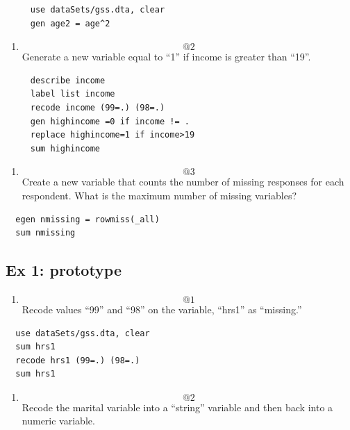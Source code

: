 \documentclass[]{book}
\providecommand{\tightlist}{%
  \setlength{\itemsep}{0pt}\setlength{\parskip}{0pt}}
\begin{document}
\begin{verbatim}
     use dataSets/gss.dta, clear
     gen age2 = age^2
\end{verbatim}

\begin{enumerate}
\def\labelenumi{\arabic{enumi}.}
\setcounter{enumi}{1}
\tightlist
\item
  \[@2\] Generate a new variable equal to ``1'' if income is greater
  than ``19''.
\end{enumerate}

\begin{verbatim}
     describe income
     label list income
     recode income (99=.) (98=.)
     gen highincome =0 if income != .
     replace highincome=1 if income>19
     sum highincome
\end{verbatim}

\begin{enumerate}
\def\labelenumi{\arabic{enumi}.}
\setcounter{enumi}{2}
\tightlist
\item
  \[@3\]Create a new variable that counts the number of missing
  responses for each respondent. What is the maximum number of missing
  variables?
\end{enumerate}

\begin{verbatim}
  egen nmissing = rowmiss(_all)
  sum nmissing
\end{verbatim}

\subsection{Ex 1: prototype}\label{ex-1-prototype-5}

\begin{enumerate}
\def\labelenumi{\arabic{enumi}.}
\tightlist
\item
  \[@1\] Recode values ``99'' and ``98'' on the variable, ``hrs1'' as
  ``missing.''
\end{enumerate}

\begin{verbatim}
  use dataSets/gss.dta, clear
  sum hrs1
  recode hrs1 (99=.) (98=.) 
  sum hrs1
\end{verbatim}

\begin{enumerate}
\def\labelenumi{\arabic{enumi}.}
\setcounter{enumi}{1}
\tightlist
\item
  \[@2\] Recode the marital variable into a ``string'' variable and then
  back into a numeric variable.
\end{enumerate}
\end{document}
